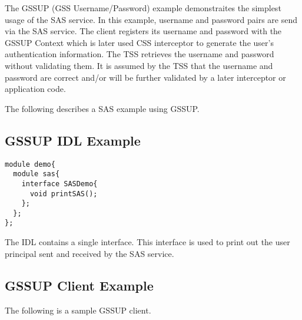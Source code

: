 The GSSUP (GSS Username/Password) example demonstraites the simplest 
usage of the SAS service. In this example, username and password
pairs are send via the SAS service. The client registers its username
and password with the GSSUP Context which is later used CSS interceptor
to generate the user's authentication information.
The TSS retrieves the username and password
without validating them. It is assumed by the TSS that the username
and password are correct and/or will be further validated by a later
interceptor or application code.

The following describes a SAS example using GSSUP.

\subsection{GSSUP IDL Example}

\begin{scriptsize}
\begin{verbatim}
module demo{
  module sas{
    interface SASDemo{
      void printSAS();
    };
  };
};
\end{verbatim}
\end{scriptsize}

The IDL contains a single interface. This interface is used to print out
the user principal sent and received by the SAS service.

\subsection{GSSUP Client Example}

The following is a sample GSSUP client.

